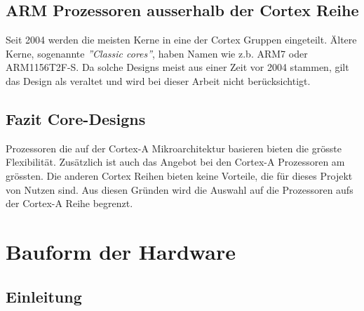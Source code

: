 \subsection{ARM Prozessoren ausserhalb der Cortex Reihe}
Seit 2004 werden die meisten Kerne in eine der Cortex Gruppen eingeteilt.
Ältere Kerne, sogenannte \textit{''Classic cores''}, haben Namen wie z.b. ARM7 oder ARM1156T2F-S.
Da solche Designs meist aus einer Zeit vor 2004 stammen, gilt das Design als veraltet und wird bei dieser Arbeit nicht berücksichtigt.

\subsection{Fazit Core-Designs}
Prozessoren die auf der Cortex-A Mikroarchitektur basieren bieten die grösste Flexibilität.
Zusätzlich ist auch das Angebot bei den Cortex-A Prozessoren am grössten.
Die anderen Cortex Reihen bieten keine Vorteile, die für dieses Projekt von Nutzen sind.
Aus diesen Gründen wird die Auswahl auf die Prozessoren aufs der Cortex-A Reihe begrenzt.

\section{Bauform der Hardware}
\subsection{Einleitung}


